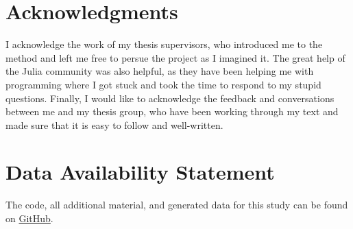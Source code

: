 \documentclass[utf8]{FrontiersinVancouver}
\begin{document}
\section*{Acknowledgments}
I acknowledge the work of my thesis supervisors, who introduced me to the method and left me free to persue the project as I imagined it. The great help of the Julia community was also helpful, as they have been helping me with programming where I got stuck and took the time to respond to my stupid questions. Finally, I would like to acknowledge the feedback and conversations between me and my thesis group, who have been working through my text and made sure that it is easy to follow and well-written.

\section*{Data Availability Statement}
The code, all additional material, and generated data for this study can be found on \href{https://github.com/MvanSteenbergen/MasterThesisRQA}{GitHub}.









\end{document}
